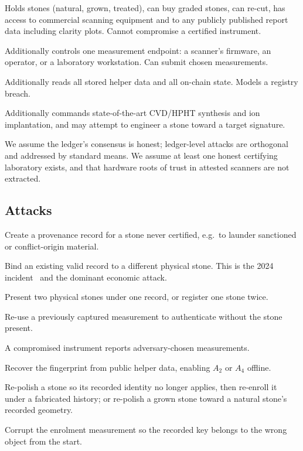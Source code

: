 \documentclass[10pt,twocolumn]{article}
\theoremstyle{remark}
\begin{document}
\begin{description}[leftmargin=1.4em,style=nextline]
\item[$\mathcal{A}_{\mathrm{mkt}}$ Market adversary.] Holds stones (natural,
grown, treated), can buy graded stones, can re-cut, has access to commercial
scanning equipment and to any publicly published report data including clarity
plots. Cannot compromise a certified instrument.
\item[$\mathcal{A}_{\mathrm{ins}}$ Insider.] Additionally controls one
measurement endpoint: a scanner's firmware, an operator, or a laboratory
workstation. Can submit chosen measurements.
\item[$\mathcal{A}_{\mathrm{reg}}$ Registry adversary.] Additionally reads all
stored helper data and all on-chain state. Models a registry breach.
\item[$\mathcal{A}_{\mathrm{fab}}$ Fabrication adversary.] Additionally
commands state-of-the-art CVD/HPHT synthesis and ion implantation, and may
attempt to engineer a stone toward a target signature.
\end{description}

We assume the ledger's consensus is honest; ledger-level attacks are orthogonal
and addressed by standard means. We assume at least one honest certifying
laboratory exists, and that hardware roots of trust in attested scanners are not
extracted.

\subsection{Attacks}

\begin{description}[leftmargin=1.4em,style=nextline]
\item[$A_1$ Record forgery.] Create a provenance record for a stone never
certified, e.g.\ to launder sanctioned or conflict-origin material.
\item[$A_2$ Substitution.] Bind an existing valid record to a different physical
stone. This is the 2024 incident~\cite{igi2024} and the dominant economic
attack.
\item[$A_3$ Cloning / double registration.] Present two physical stones under
one record, or register one stone twice.
\item[$A_4$ Replay.] Re-use a previously captured measurement to authenticate
without the stone present.
\item[$A_5$ Oracle compromise.] A compromised instrument reports
adversary-chosen measurements.
\item[$A_6$ Template inversion.] Recover the fingerprint from public helper
data, enabling $A_2$ or $A_4$ offline.
\item[$A_7$ Re-cut laundering.] Re-polish a stone so its recorded identity no
longer applies, then re-enroll it under a fabricated history; or re-polish a
grown stone toward a natural stone's recorded geometry.
\item[$A_8$ Enrolment poisoning.] Corrupt the enrolment measurement so the
recorded key belongs to the wrong object from the start.
\end{description}
\end{document}

